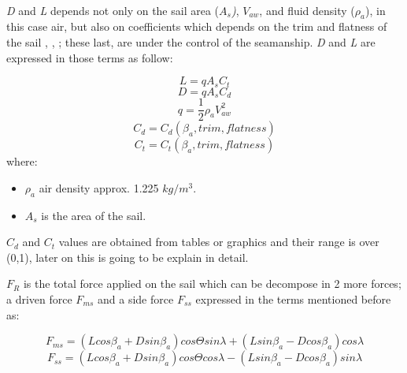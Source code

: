\\ \textit{D} and \textit{L} depends not only on  the sail area (\textit{$A_{s}$)}, $V_{aw}$, and fluid density ($\rho_{a}$), in this case air, but also on coefficients which depends on the trim and flatness of the sail \cite{philpott1993yacht}, \cite{carrico17symp}, \cite{day2017performance}; these last, are under the control of the seamanship. \textit{D} and \textit{L}  are expressed in those terms as follow: \par
\begin{equation} \label{eq:Lift}
  L=qA_{s}C_{t}  
\end{equation}
\begin{equation} \label{eq:Draf}
    D=qA_{s}C_{d}  
\end{equation}
\begin{equation} \label{eq:dynamic_press}
    q=\frac{1}{2}\rho_{a} V_{aw}^2
\end{equation}
\begin{equation} \label{eq:Cd}
    C_{d}=C_{d}(\beta_{a},trim, flatness)
\end{equation}
\begin{equation} \label{eq:Ct}
    C_{t}=C_{t}(\beta_{a},trim, flatness)
\end{equation}
where:
\begin{itemize} \label{ae_symbols}
    \item $\rho_{a}$ air density approx. 1.225 $kg/m^3$.
    \item $A_{s}$ is the area of the sail.
\end{itemize}

$C_{d}$ and $C_{t}$ values are obtained from tables or graphics and their range is over (0,1), later on this is going to be explain in detail. \par 
$F_{R}$ is the total force applied on the sail which can be decompose in 2 more forces; a driven force $F_{ms}$ and a side force $F_{ss}$ expressed in the terms mentioned before as:\par
\begin{equation}\label{eq:drive_sail_force}
    F_{ms}= (L cos \beta_{a}+ D sin \beta_{a})cos \Theta sin \lambda + (L sin \beta_{a}-D cos\beta_{a})cos \lambda
\end{equation}
\begin{equation}\label{eq:side_sail_force}
    F_{ss}=(L cos \beta_{a}+ D sin \beta_{a})cos \Theta cos \lambda - (L sin \beta_{a}-D cos\beta_{a})sin \lambda
\end{equation}

